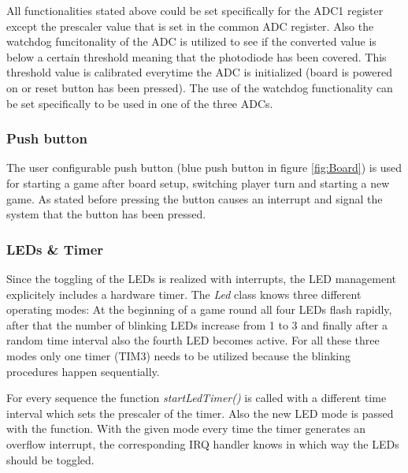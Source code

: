 All functionalities stated above could be set specifically for the ADC1 register except the prescaler value that is set in the common ADC register. Also the watchdog funcitonality of the ADC is utilized to see if the converted value is below a certain threshold meaning that the photodiode has been covered. This threshold value is calibrated everytime the ADC is initialized (board is powered on or reset button has been pressed). The use of the watchdog functionality can be set specifically to be used in one of the three ADCs.

\subsubsection{Push button}
The user configurable push button (blue push button in figure \ref{fig:Board}) is used for starting a game after board setup, switching player turn and starting a new game. As stated before pressing the button causes an interrupt and signal the system that the button has been pressed. 


\subsubsection{LEDs \& Timer}
Since the toggling of the LEDs is realized with interrupts, the LED management explicitely includes a hardware timer. The \emph{Led} class knows three different operating modes: At the beginning of a game round all four LEDs flash rapidly, after that the number of blinking LEDs increase from 1 to 3 and finally after a random time interval also the fourth LED becomes active. For all these three modes only one timer (TIM3) needs to be utilized because the blinking procedures happen sequentially.\\
\par
For every sequence the function \emph{startLedTimer()} is called with a different time interval which sets the prescaler of the timer. Also the new LED mode is passed with the function. With the given mode every time the timer generates an overflow interrupt, the corresponding IRQ handler knows in which way the LEDs should be toggled.

